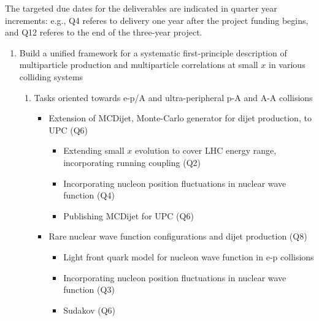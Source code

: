 The targeted due dates for the deliverables are indicated in quarter year
increments: e.g., Q4 referes to delivery one year after the project funding
begins, and Q12 referes to the end of the three-year project.


\renewcommand{\labelenumii}{\arabic{enumi}.\arabic{enumii}}
\renewcommand{\labelenumiii}{\arabic{enumi}.\arabic{enumii}.\arabic{enumiii}}
\renewcommand{\labelenumiv}{\arabic{enumi}.\arabic{enumii}.\arabic{enumiii}.\arabic{enumiv}}

\begin{enumerate}
\setcounter{enumi}{0} %

    \item Build a unified framework for a systematic first-principle 
		description of multiparticle production and multiparticle 
		correlations at small $x$ in various colliding systems
        \begin{enumerate}
            \item Tasks oriented towards e-p/A and  
				ultra-peripheral p-A and A-A collisions   
                \begin{itemize}
                    \item Extension of MCDijet,  Monte-Carlo generator 
						for dijet production, to UPC (Q6)
                        \begin{itemize}
                            \item Extending small $x$ evolution to cover 
								LHC energy range, incorporating running
								coupling (Q2)
                            \item Incorporating nucleon position fluctuations 
								in nuclear wave function (Q4)
                            \item Publishing MCDijet for UPC  (Q6)
                        \end{itemize}
                    \item Rare nuclear wave function configurations 
						and dijet production 
						(Q8)
                        \begin{itemize}
							\item Light front quark model for 
							nucleon wave function in e-p collisions  
                            \item Incorporating nucleon position fluctuations 
								in nuclear wave function   (Q3)
                            \item Sudakov  (Q6)

\end{itemize}
\end{itemize}
\end{enumerate}
\end{enumerate}
